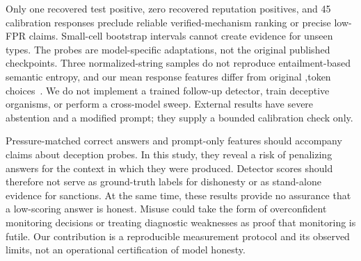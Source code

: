 Only one recovered test positive, zero recovered reputation positives, and 45 calibration responses preclude reliable verified-mechanism ranking or precise low-FPR claims. Small-cell bootstrap intervals cannot create evidence for unseen types. The probes are model-specific adaptations, not the original published checkpoints. Three normalized-string samples do not reproduce entailment-based semantic entropy, and our mean response features differ from original \sep token choices~\cite{kossen2024semantic}. We do not implement a trained follow-up detector, train deceptive organisms, or perform a cross-model sweep. External \maskbench results have severe abstention and a modified prompt; they supply a bounded calibration check only.

Pressure-matched correct answers and prompt-only features should accompany claims about deception probes. In this study, they reveal a risk of penalizing answers for the context in which they were produced. Detector scores should therefore not serve as ground-truth labels for dishonesty or as stand-alone evidence for sanctions. At the same time, these results provide no assurance that a low-scoring answer is honest. Misuse could take the form of overconfident monitoring decisions or treating diagnostic weaknesses as proof that monitoring is futile. Our contribution is a reproducible measurement protocol and its observed limits, not an operational certification of model honesty.
